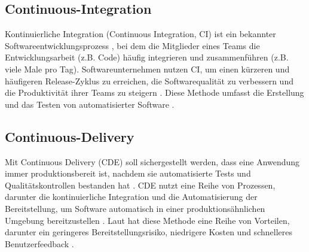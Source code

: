 \subsection{Continuous-Integration}
Kontinuierliche Integration (Continuous Integration, CI) ist ein bekannter Softwareentwicklungsprozess \cite{fitzgerald2017continuous}, bei dem die Mitglieder eines Teams die Entwicklungsarbeit (z.B. Code) häufig integrieren und zusammenführen (z.B. viele Male pro Tag). Softwareunternehmen nutzen CI, um einen kürzeren und häufigeren Release-Zyklus zu erreichen, die Softwarequalität zu verbessern und die Produktivität ihrer Teams zu steigern \cite{fitzgerald2017continuous}. Diese Methode umfasst die Erstellung und das Testen von automatisierter Software \cite{leppanen2015highways, shahin2017continuous}.

\subsection{Continuous-Delivery}
Mit Continuous Delivery (CDE) soll sichergestellt werden, dass eine Anwendung immer produktionsbereit ist, nachdem sie automatisierte Tests und Qualitätskontrollen bestanden hat \cite{weber2016developing, humble2010continuous}.
CDE nutzt eine Reihe von Prozessen, darunter die kontinuierliche Integration und die Automatisierung der Bereitstellung, um Software automatisch in einer produktionsähnlichen Umgebung bereitzustellen \cite{shahin2017beyond}. Laut \cite{humble2010continuous, shahin2017beyond} hat diese Methode eine Reihe von Vorteilen, darunter ein geringeres Bereitstellungsrisiko, niedrigere Kosten und schnelleres Benutzerfeedback \cite{shahin2017continuous}.

